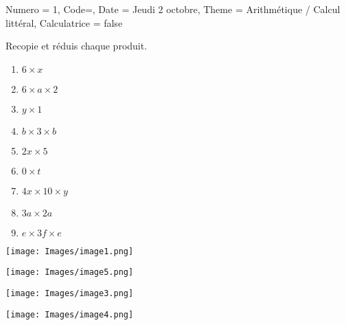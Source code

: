 \documentclass[11pt]{article}
\begin{document}
\begin{Maquette}[IE]{
        Numero = 1, Code={}, Date = Jeudi 2 octobre, Theme = Arithmétique / Calcul littéral, Calculatrice = false
    }
\begin{multicols}{2}
\begin{exercice}
    Recopie et réduis chaque produit.
    \begin{multicols}{3}
        \begin{enumerate}[label=\textbf{\alph*.}]
        \item $6\times x$
        \item $6\times a \times 2$
        \item $y \times 1$
        \item $b \times 3 \times b$
        \item $2x\times 5$
        \item $0 \times t$
        \item $4x \times 10 \times y$
        \item $3a \times 2a$
        \item $e \times 3f \times e$
    \end{enumerate}
    \end{multicols}
\end{exercice}

    \end{multicols}
    \begin{exercice}
        \begin{multicols}{2}
            \begin{center}
                \texttt{[image: Images/image1.png]}

                \texttt{[image: Images/image5.png]}

                \texttt{[image: Images/image3.png]}

                \texttt{[image: Images/image4.png]}
            \end{center}
        \end{multicols}
    \end{exercice}

\end{Maquette}
\end{document}
